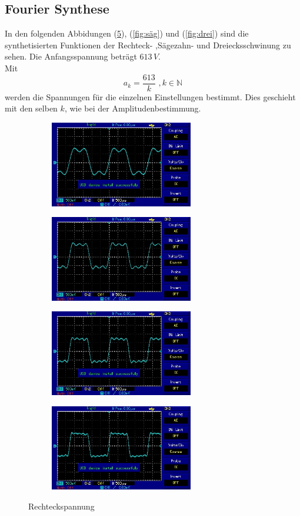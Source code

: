 \subsection{Fourier Synthese}
In den folgenden Abbidungen (\ref{fig:reck}), (\ref{fig:säg}) und (\ref{fig:drei})
sind die synthetisierten Funktionen der Rechteck- ,Sägezahn- und Dreiecksschwinung zu sehen.
Die Anfangsspannung beträgt $613\, V$. \\
Mit
\begin{equation}
  a_k = \frac{613}{k} \,\, ,k \in \mathds{N}
  \label{eqn:for}
\end{equation}
werden die Spannungen für die einzelnen Einstellungen bestimmt.
Dies geschieht mit den selben $k$,
wie bei der Amplitudenbestimmung.
\begin{figure}[h]
\centering
\begin{subfigure}{0.48\textwidth}
\centering
\includegraphics[height=3.75cm]{MAP003.jpg}
\label{fig:reck1}
\end{subfigure}
\begin{subfigure}{0.48\textwidth}
\centering
\includegraphics[height=3.75cm]{MAP004.jpg}
\label{fig:reck2}
\end{subfigure}
\begin{subfigure}{0.48\textwidth}
\centering
\includegraphics[height=3.75cm]{MAP005.jpg}
\label{fig:reck3}
\end{subfigure}
\begin{subfigure}{0.48\textwidth}
\centering
\includegraphics[height=3.75cm]{MAP006.jpg}
\label{fig:reck4}
\end{subfigure}
\caption{Rechteckspannung}
\label{fig:reck}
\end{figure}
